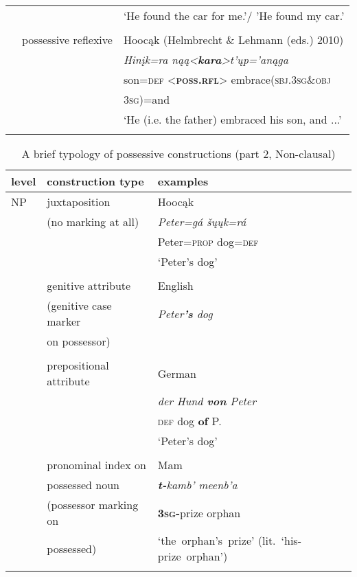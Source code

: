 \documentclass[output=paper]{LSP/langsci}
\begin{document}
\begin{table}
\begin{tabular}{l l l }
& & `He found the car for me.'/ 'He found my car.' \\
& \\
& possessive reflexive & Hooc\k{a}k (Helmbrecht \& Lehmann (eds.) 2010) \\
& & \textit{Hinįk=ra n\k{a}\k{a}<\textbf{kara}>t’ųp='an\k{a}ga} \\
& & son=\textsc{def} <\textbf{\textsc{poss.rfl}}> embrace(\textsc{sbj.3sg}\&\textsc{obj} \\
& & \textsc{3sg})=and \\
& &  `He (i.e. the father) embraced his son, and ...'\\
\lspbottomrule
\end{tabular}
\end{table} 

\begin{table}
\caption{A brief typology of possessive constructions (part 2, Non-clausal)} \label{typology2}
\begin{tabularx}{\textwidth}{l l X }
\lsptoprule
level & construction type & examples \\
\midrule
NP  & juxtaposition & Hooc\k{a}k \citep[13]{Helmbrecht2003}  \\
& (no marking at all) & \textit{Peter=gá        šųųk=rá} \\
&  & Peter=\textsc{prop}  dog=\textsc{def} \\
& & `Peter's dog' \\
& \\
& genitive attribute & English \\
& (genitive case marker & \textit{Peter\textbf{'s} dog} \\
&  on possessor) & \\
& \\
& prepositional attribute & German \\
& & \textit{der Hund \textbf{von} Peter} \\
& & \textsc{def} dog    \textbf{of}   P. \\
& & `Peter's dog' \\
& \\
 & pronominal index on  & Mam \citep[142]{England1983} \\
& possessed noun & \textit{\textbf{t-}kamb'    meenb'a} \\
& (possessor marking on & \textbf{\textsc{3sg}-}prize orphan \\
& possessed) & \mbox{`the orphan's prize'} \mbox{(lit. `his-prize orphan')}  \\
& \\

\end{tabularx}
\end{table}
\end{document}
